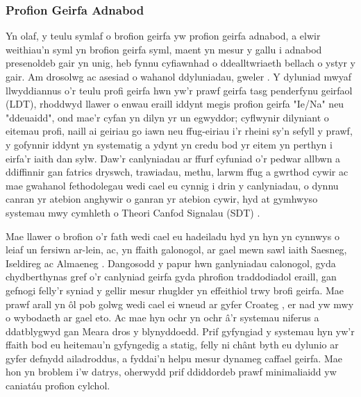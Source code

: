 \subsubsection{Profion Geirfa Adnabod}
Yn olaf, y teulu symlaf o brofion geirfa yw profion geirfa adnabod, a elwir weithiau'n syml yn brofion geirfa syml, maent yn mesur y gallu i adnabod presenoldeb gair yn unig, heb fynnu cyfiawnhad o ddealltwriaeth bellach o ystyr y gair. Am drosolwg ac asesiad o wahanol ddyluniadau, gweler \cite{meara_complexities_1994}. Y dyluniad mwyaf llwyddiannus o'r teulu profi geirfa hwn yw'r prawf geirfa tasg penderfynu geirfaol (LDT), rhoddwyd llawer o enwau eraill iddynt megis profion geirfa "Ie/Na" neu "ddeuaidd", ond mae'r cyfan yn dilyn yr un egwyddor; cyflwynir dilyniant o eitemau profi, naill ai geiriau go iawn neu ffug-eiriau \parencite{meara_imaginary_2012} i'r rheini sy'n sefyll y prawf, y gofynnir iddynt yn systematig a ydynt yn credu bod yr eitem yn perthyn i eirfa'r iaith dan sylw. Daw'r canlyniadau ar ffurf cyfuniad o'r pedwar allbwn a ddiffinnir gan fatrics dryswch, trawiadau, methu, larwm ffug a gwrthod cywir ac mae gwahanol fethodolegau wedi cael eu cynnig i drin y canlyniadau, o dynnu canran yr atebion anghywir o ganran yr atebion cywir, hyd at gymhwyso systemau mwy cymhleth o Theori Canfod Signalau (SDT) \parencite{huibregtse_scores_2002}.

Mae llawer o brofion o'r fath wedi cael eu hadeiladu hyd yn hyn yn cynnwys o leiaf un fersiwn ar-lein, ac, yn ffaith galonogol, ar gael mewn sawl iaith Saesneg, Iseldireg ac Almaeneg \parencite{lemhofer_introducing_2012}. Dangosodd y papur hwn ganlyniadau calonogol, gyda chydberthynas gref o'r canlyniad geirfa gyda phrofion traddodiadol eraill, gan gefnogi felly'r syniad y gellir mesur rhuglder yn effeithiol trwy brofi geirfa. Mae prawf arall yn ôl pob golwg wedi cael ei wneud ar gyfer Croateg \parencite{srce_how_2025}, er nad yw mwy o wybodaeth ar gael eto. Ac mae hyn ochr yn ochr â'r systemau niferus a ddatblygwyd gan Meara dros y blynyddoedd\cite{meara_complexities_1994}. Prif gyfyngiad y systemau hyn yw'r ffaith bod eu heitemau'n gyfyngedig a statig, felly ni chânt byth eu dylunio ar gyfer defnydd ailadroddus, a fyddai'n helpu mesur dynameg caffael geirfa. Mae hon yn broblem i'w datrys, oherwydd prif ddiddordeb prawf minimaliaidd yw caniatáu profion cylchol.

